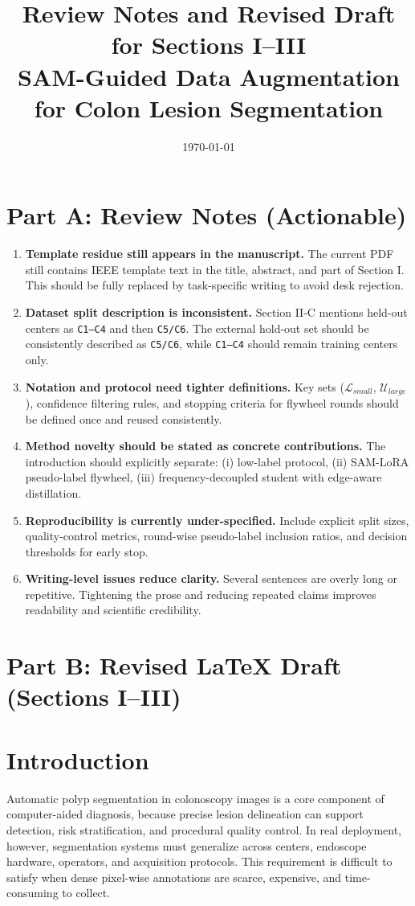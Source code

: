 ﻿\documentclass[11pt]{article}
\title{Review Notes and Revised Draft for Sections I--III\\
\large SAM-Guided Data Augmentation for Colon Lesion Segmentation}
\author{}
\date{\today}
\begin{document}
\maketitle

\section*{Part A: Review Notes (Actionable)}
\begin{enumerate}[leftmargin=1.5em]
\item \textbf{Template residue still appears in the manuscript.} The current PDF still contains IEEE template text in the title, abstract, and part of Section I. This should be fully replaced by task-specific writing to avoid desk rejection.
\item \textbf{Dataset split description is inconsistent.} Section II-C mentions held-out centers as \texttt{C1--C4} and then \texttt{C5/C6}. The external hold-out set should be consistently described as \texttt{C5/C6}, while \texttt{C1--C4} should remain training centers only.
\item \textbf{Notation and protocol need tighter definitions.} Key sets ($\mathcal{L}_{small}$, $\mathcal{U}_{large}$), confidence filtering rules, and stopping criteria for flywheel rounds should be defined once and reused consistently.
\item \textbf{Method novelty should be stated as concrete contributions.} The introduction should explicitly separate: (i) low-label protocol, (ii) SAM-LoRA pseudo-label flywheel, (iii) frequency-decoupled student with edge-aware distillation.
\item \textbf{Reproducibility is currently under-specified.} Include explicit split sizes, quality-control metrics, round-wise pseudo-label inclusion ratios, and decision thresholds for early stop.
\item \textbf{Writing-level issues reduce clarity.} Several sentences are overly long or repetitive. Tightening the prose and reducing repeated claims improves readability and scientific credibility.
\end{enumerate}

\section*{Part B: Revised LaTeX Draft (Sections I--III)}

\section{Introduction}
Automatic polyp segmentation in colonoscopy images is a core component of computer-aided diagnosis, because precise lesion delineation can support detection, risk stratification, and procedural quality control. In real deployment, however, segmentation systems must generalize across centers, endoscope hardware, operators, and acquisition protocols. This requirement is difficult to satisfy when dense pixel-wise annotations are scarce, expensive, and time-consuming to collect.
\end{document}
